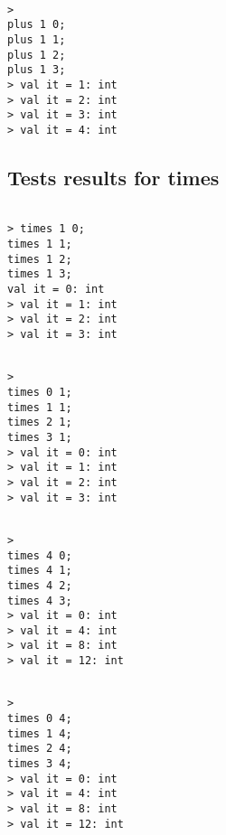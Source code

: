 \documentclass{report}
\begin{document}
\begin{session}
  \begin{scriptsize}
\begin{verbatim}

> 
plus 1 0;
plus 1 1;
plus 1 2;
plus 1 3;
> val it = 1: int
> val it = 2: int
> val it = 3: int
> val it = 4: int
\end{verbatim}
  \end{scriptsize}
\end{session}

\subsection{Tests results for times}
\label{sec:tests-times}

\begin{session}
  \begin{scriptsize}
\begin{verbatim}

> times 1 0;
times 1 1;
times 1 2;
times 1 3;
val it = 0: int
> val it = 1: int
> val it = 2: int
> val it = 3: int
\end{verbatim}
  \end{scriptsize}
\end{session}

\begin{session}
  \begin{scriptsize}
\begin{verbatim}

> 
times 0 1;
times 1 1;
times 2 1;
times 3 1;
> val it = 0: int
> val it = 1: int
> val it = 2: int
> val it = 3: int
\end{verbatim}
  \end{scriptsize}
\end{session}

\begin{session}
  \begin{scriptsize}
\begin{verbatim}

> 
times 4 0;
times 4 1;
times 4 2;
times 4 3;
> val it = 0: int
> val it = 4: int
> val it = 8: int
> val it = 12: int
\end{verbatim}
  \end{scriptsize}
\end{session}

\begin{session}
  \begin{scriptsize}
\begin{verbatim}

> 
times 0 4;
times 1 4;
times 2 4;
times 3 4;
> val it = 0: int
> val it = 4: int
> val it = 8: int
> val it = 12: int
\end{verbatim}
  \end{scriptsize}
\end{session}
\end{document}
